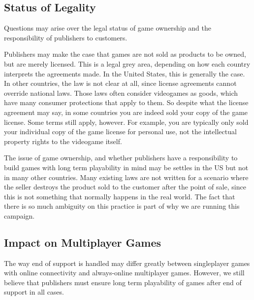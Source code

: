 \subsection{Status of Legality}
Questions may arise over the legal status of game ownership and the responsibility of publishers to customers.

Publishers may make the case that games are not sold as products to be owned, but are merely licensed.
This is a legal grey area, depending on how each country interprets the agreements made.
In the United States, this is generally the case\cn.
In other countries, the law is not clear at all, since license agreements cannot override national laws.
Those laws often consider videogames as goods, which have many consumer protections that apply to them\cn.
So despite what the license agreement may say, in some countries you are indeed sold your copy of the game license.
Some terms still apply, however.
For example, you are typically only sold your individual copy of the game license for personal use, not the intellectual property rights to the videogame itself.

The issue of game ownership, and whether publishers have a responsibility to build games with long term playability in mind may be settles in the US but not in many other countries\cn.
Many existing laws are not written for a scenario where the seller destroys the product sold to the customer after the point of sale,
since this is not something that normally happens in the real world.
The fact that there is so much ambiguity on this practice is part of why we are running this campaign.


\subsection{Impact on Multiplayer Games}
The way end of support is handled may differ greatly between singleplayer games with online connectivity and always-online multiplayer games.
However, we still believe that publishers must ensure long term playability of games after end of support in all cases.

